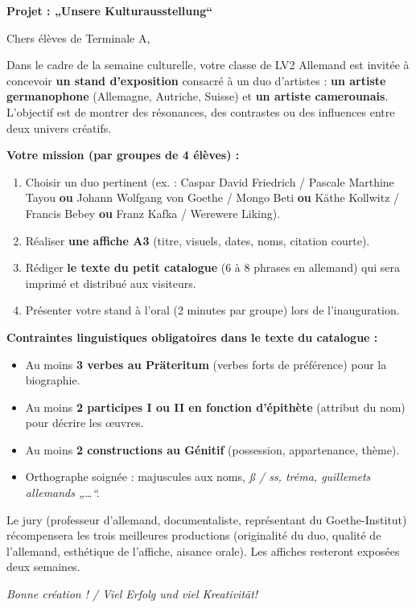 \documentclass[11pt]{article}
\newcommand{\all}[1]{\ifmmode\text{\textit{#1}}\else\begingroup\selectlanguage{ngerman}\itshape #1\endgroup\fi}
\begin{document}
\begin{textebox}
\textbf{Projet : „Unsere Kulturausstellung“}

Chers élèves de Terminale A,

Dans le cadre de la semaine culturelle, votre classe de LV2 Allemand est invitée à concevoir \textbf{un stand d'exposition} consacré à un duo d'artistes : \textbf{un artiste germanophone} (Allemagne, Autriche, Suisse) et \textbf{un artiste camerounais}. L'objectif est de montrer des résonances, des contrastes ou des influences entre deux univers créatifs.

\textbf{Votre mission (par groupes de 4 élèves) :}
\begin{enumerate}
    \item Choisir un duo pertinent (ex. : Caspar David Friedrich / Pascale Marthine Tayou \textbf{ou} Johann Wolfgang von Goethe / Mongo Beti \textbf{ou} Käthe Kollwitz / Francis Bebey \textbf{ou} Franz Kafka / Werewere Liking).
    \item Réaliser \textbf{une affiche A3} (titre, visuels, dates, noms, citation courte).
    \item Rédiger \textbf{le texte du petit catalogue} (6 à 8 phrases en allemand) qui sera imprimé et distribué aux visiteurs.
    \item Présenter votre stand à l'oral (2 minutes par groupe) lors de l'inauguration.
\end{enumerate}

\textbf{Contraintes linguistiques obligatoires dans le texte du catalogue :}
\begin{itemize}
    \item Au moins \textbf{3 verbes au Präteritum} (verbes forts de préférence) pour la biographie.
    \item Au moins \textbf{2 participes I ou II en fonction d'épithète} (attribut du nom) pour décrire les œuvres.
    \item Au moins \textbf{2 constructions au Génitif} (possession, appartenance, thème).
    \item Orthographe soignée : majuscules aux noms, \all{ß} / \all{ss}, tréma, guillemets allemands „…“.
\end{itemize}

Le jury (professeur d'allemand, documentaliste, représentant du Goethe-Institut) récompensera les trois meilleures productions (originalité du duo, qualité de l'allemand, esthétique de l'affiche, aisance orale). Les affiches resteront exposées deux semaines.
\vspace{0.2cm}

\noindent \textit{Bonne création ! / Viel Erfolg und viel Kreativität!}
\end{textebox}
\end{document}
